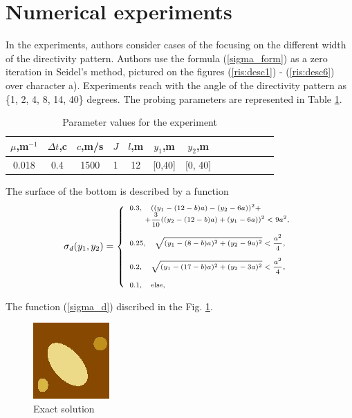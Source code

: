 \documentclass{procDDs}
\begin{document}
\section{Numerical experiments}
In the experiments, authors consider cases of the focusing on the different width of the directivity pattern. Authors use the formula (\ref{sigma_form}) as a zero iteration in Seidel's method, pictured on the figures (\ref{ris:desc1}) - (\ref{ris:desc6}) over character a). Experiments reach with the angle of the directivity pattern as  \{1, 2, 4, 8, 14, 40\} degrees. 
The probing parameters are represented in Table \ref{table:name}.
\begin{table}[!ht]
	\begin{tabular}{|c|c|c|c|c|c|c|c|c|c|c|c|c|}
		\hline
		$\mu$,m$^{-1}$ & $\Delta t$,c & $c$,m/s & $J$ & $l$,m & $y_1$,m & $y_2$,m\\
		\hline
		0.018 & 0.4 & 1500 & 1 & 12 & [0,40] & [0, 40]\\ \hline
	\end{tabular}
	\label{table:name}
	\caption{Parameter values for the experiment}
\end{table}

The surface of the bottom is described by a function 
\begin{equation}
\scriptsize
\label{sigma_d}
\sigma_d(y_1, y_2) = 
\left\{
\begin{array}{ll}
0.3 , \quad  ((y_1-(12-b)a)-(y_2-6a))^2+\\ \quad \quad +\dfrac{3}{10}((y_2-(12-b)a)+(y_1-6a))^2<9a^2,  \\ \\
0.25, \quad \sqrt{(y_1-(8-b)a)^2+(y_2-9a)^2}<\dfrac{a^2}{4}, \\ \\
0.2 ,\quad  \sqrt{(y_1-(17-b)a)^2+(y_2-3a)^2}<\dfrac{a^2}{4}, \\ \\
0.1 , \quad \hbox{else,} \\
\end{array}%
\right.
\end{equation}

The function (\ref{sigma_d}) discribed in the Fig. \ref{ris:dno}.

\begin{figure}[h!]\center
	
	\includegraphics[width=0.3\linewidth]{dno.jpg}
	\caption{Exact solution}
	\label{ris:dno}
\end{figure}
\end{document}
